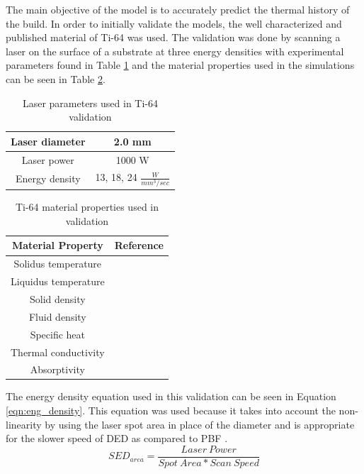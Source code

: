 \documentclass[pdflatex,sn-mathphys]{sn-jnl}
\begin{document}
	The main objective of the model is to accurately predict the thermal history of the build.  
	In order to initially validate the models, the well characterized and published material of Ti-64 was used.  The validation was done by scanning a laser on the surface of a substrate at three energy densities with experimental parameters found in Table \ref{tab:ti64_parameters} and the material properties used in the simulations can be seen in Table \ref{tab:ti64_properties}.
	\begin{table}[!htb] \centering
		\caption{Laser parameters used in Ti-64 validation}
		\label{tab:ti64_parameters}
			\begin{tabular}{|c|c|} \hline 
				Laser diameter & 2.0 mm \\ \hline
				Laser power & 1000 W \\ \hline
				Energy density & 13, 18, 24 $\frac{W}{mm^3/sec}$ \\ \hline
			\end{tabular}
	\end{table}
	\begin{table}[!htb] \centering
		\caption{Ti-64  material properties used in validation}
		\label{tab:ti64_properties}
		\begin{tabular}{|c|c|} \hline
			Material Property & Reference \\ \hline
			Solidus temperature & \cite{welschgerhard_1993} \\ \hline
			Liquidus temperature & \cite{mills_2002} \\ \hline
			Solid density  & \cite{mills_2002} \\ \hline
			Fluid density & \cite{mills_2002} \\ \hline
			Specific heat & \cite{boivineau_2006} \\ \hline
			Thermal conductivity & \cite{boivineau_2006} \\ \hline
			Absorptivity & \cite{fan_2012} \\ \hline
		\end{tabular}
	\end{table}
	The energy density equation used in this validation can be seen in Equation \ref{eqn:eng_density}.  This equation was used because it takes into account the non-linearity by using the laser spot area in place of the diameter and is appropriate for the slower speed of \ac{DED} as compared to \ac{PBF} \cite{kurzynowskiEffectScanningSupport2019}.
	\begin{equation}
		SED_{area} = \frac{Laser\ Power}{Spot\ Area * Scan\ Speed} \label{eqn:eng_density}
	\end{equation}
	
\end{document}
